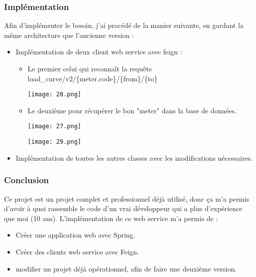 \subsubsection{Implémentation}
Afin d'implémenter le besoin, j'ai procédé de la manier suivante, en gardant la même architecture que l'ancienne version :
\begin{itemize}
	\item Implémentation de deux client web service avec feign :
	\begin{itemize}
		\item Le premier celui qui reconnaît la requête load{\_}curve/v2/\{meter.code\}/\{from\}/\{to\}
		\begin{center}
			\texttt{[image: 28.png]}
		\end{center}
		\item Le deuxième pour récupérer le bon "meter" dans la base de données.
		\begin{center}
			\texttt{[image: 27.png]}
		\end{center}			
		\begin{center}
			\texttt{[image: 29.png]}
		\end{center}
	\end{itemize}
	\item Implémentation de toutes les autres classes avec les modifications nécessaires. 
\end{itemize}
\subsubsection{Conclusion}
Ce projet est un projet complet et professionnel déjà utilisé, donc ça m'a permis d'avoir à quoi rassemble le code d'un vrai développeur qui a plus d’expérience que moi (10 ans).
L'implémentation de ce web service m'a permis de :
\begin{itemize}
	\item Créer une application web avec Spring.
	\item Créer des clients web service avec Feign.
	\item modifier un projet déjà opérationnel, afin de faire une deuxième version. 
\end{itemize}
